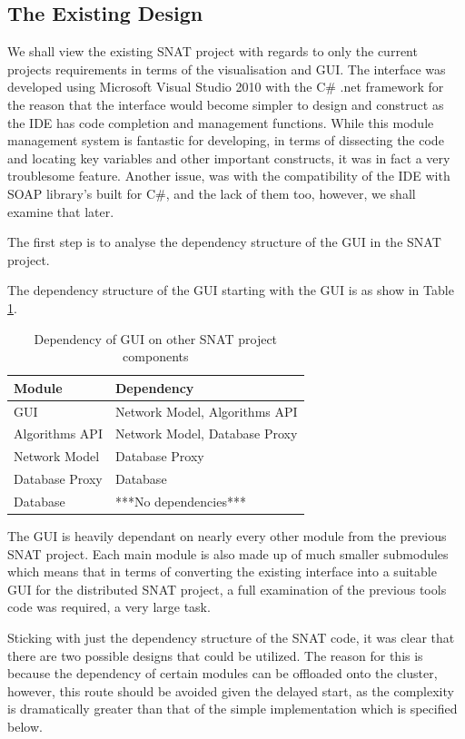\subsection{The Existing Design}
We shall view the existing SNAT project with regards to only the current projects requirements in terms of the visualisation and GUI. The interface was developed using Microsoft Visual Studio 2010 with the C\# .net framework for the reason that the interface would become simpler to design and construct as the IDE has code completion and management functions. While this module management system is fantastic for developing, in terms of dissecting the code and locating key variables and other important constructs, it was in fact a very troublesome feature. Another issue, was with the compatibility of the IDE with SOAP library's built for C\#, and the lack of them too, however, we shall examine that later.


The first step is to analyse the dependency structure of the GUI in the SNAT project. 

The dependency structure of the GUI starting with the GUI is as show in Table \ref{tab:guidep}.

\begin{table}[htbp]%
\centering
\begin{tabular}{|l|l|}
\hline
Module & Dependency \\
\hline
GUI	& Network Model, Algorithms API \\
Algorithms API	& Network Model, Database Proxy \\
Network Model	& Database Proxy \\
Database Proxy	& Database \\
Database	& ***No dependencies*** \\
\hline
\end{tabular}
\caption{Dependency of GUI on other SNAT project components}
\label{tab:guidep}
\end{table}

The GUI is heavily dependant on nearly every other module from the previous SNAT project. Each main module is also made up of much smaller submodules which means that in terms of converting the existing interface into a suitable GUI for the distributed SNAT project, a full examination of the previous tools code was required, a very large task. 

Sticking with just the dependency structure of the SNAT code, it was clear that there are two possible designs that could be utilized. The reason for this is because the dependency of certain modules can be offloaded onto the cluster, however, this route should be avoided given the delayed start, as the complexity is dramatically greater than that of the simple implementation which is specified below.

